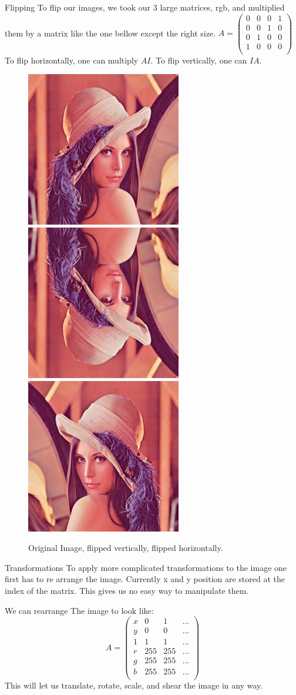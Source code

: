 \documentclass{beamer}
\begin{document}
\begin{frame}{Flipping}
To flip our images, we took our 3 large matrices, rgb, and multiplied them by a matrix like the one bellow except the right size.
$A = \begin{pmatrix}
	0 & 0 & 0 & 1\\
	0 & 0 & 1 & 0\\
	0 & 1 & 0 & 0\\
	1 & 0 & 0 & 0\\
\end{pmatrix}$
To flip horizontally, one can multiply $AI$. To flip vertically, one can $IA$.

\begin{figure}
\includegraphics[width = 0.9 in]{lennastory.jpg}
\hspace{0.5 in}
\includegraphics[width = 0.9 in]{lenna1.png}
\hspace{0.5 in}
\includegraphics[width = 0.9 in]{lenna2.png}
\caption{Original Image, flipped vertically, flipped horizontally.}
\end{figure}


\end{frame}


\begin{frame}{Transformations}
To apply more complicated transformations to the image one first has to re arrange the image. Currently x and y position are stored at the index of the matrix. This gives us no easy way to manipulate them.

We can rearrange The image to look like:
$$A = \begin{pmatrix}
	x & 0 & 1 &...\\
	y & 0 & 0 &...\\
	1 & 1 &  1 &...\\
	r &  255 & 255 &...\\
	g & 255 & 255 &...\\
	b & 255 & 255 &...\\
\end{pmatrix}$$
This will let us translate, rotate, scale, and shear the image in any way.

\end{frame}
\end{document}
